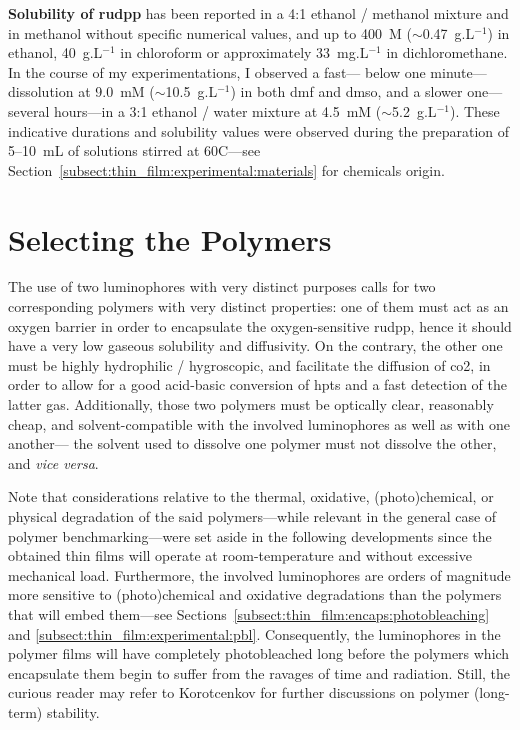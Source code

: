 \textbf{Solubility of \gls{rudpp}} has been reported in a 4:1 ethanol / methanol mixture\cite{alford1985} and in methanol\cite{demas1977} without specific numerical values, and up to 400~{\textmu}M ($\sim$0.47~g.L$^{-1}$) in ethanol\cite{baker2000}, 40~g.L$^{-1}$ in chloroform\cite{khan2015} or approximately 33~mg.L$^{-1}$ in dichloromethane\cite{xu1994}. In the course of my experimentations, I observed a fast---\ie{} below one minute---dissolution at 9.0~mM ($\sim$10.5~g.L$^{-1}$) in both \gls{dmf} and \gls{dmso}, and a slower one---\ie{} several hours---in a 3:1 ethanol / water mixture at 4.5~mM ($\sim$5.2~g.L$^{-1}$). These indicative durations and solubility values were observed during the preparation of 5--10~mL of solutions stirred at 60{\degree}C---see Section~\ref{subsect:thin_film:experimental:materials} for chemicals origin.

\section{Selecting the Polymers}\label{sect:thin_film:select_poly}

The use of two luminophores with very distinct purposes calls for two corresponding polymers with very distinct properties: one of them must act as an oxygen barrier in order to encapsulate the oxygen-sensitive \gls{rudpp}, hence it should have a very low gaseous solubility and diffusivity. On the contrary, the other one must be highly hydrophilic / hygroscopic, and facilitate the diffusion of \gls{co2}, in order to allow for a good acid-basic conversion of \gls{hpts} and a fast detection of the latter gas. Additionally, those two polymers must be optically clear, reasonably cheap, and solvent-compatible with the involved luminophores as well as with one another---\ie{} the solvent used to dissolve one polymer must not dissolve the other, and \textit{vice versa}.

Note that considerations relative to the thermal, oxidative, (photo)chemical, or physical degradation of the said polymers---while relevant in the general case of polymer benchmarking---were set aside in the following developments since the obtained thin films will operate at room-temperature and without excessive mechanical load. Furthermore, the involved luminophores are orders of magnitude more sensitive to (photo)chemical and oxidative degradations than the polymers that will embed them---see Sections~\ref{subsect:thin_film:encaps:photobleaching} and \ref{subsect:thin_film:experimental:pbl}. Consequently, the luminophores in the polymer films will have completely photobleached long before the polymers which encapsulate them begin to suffer from the ravages of time and radiation. Still, the curious reader may refer to Korotcenkov for further discussions on polymer (long-term) stability\cite[Chap.~9]{korotcenkov2014}.

